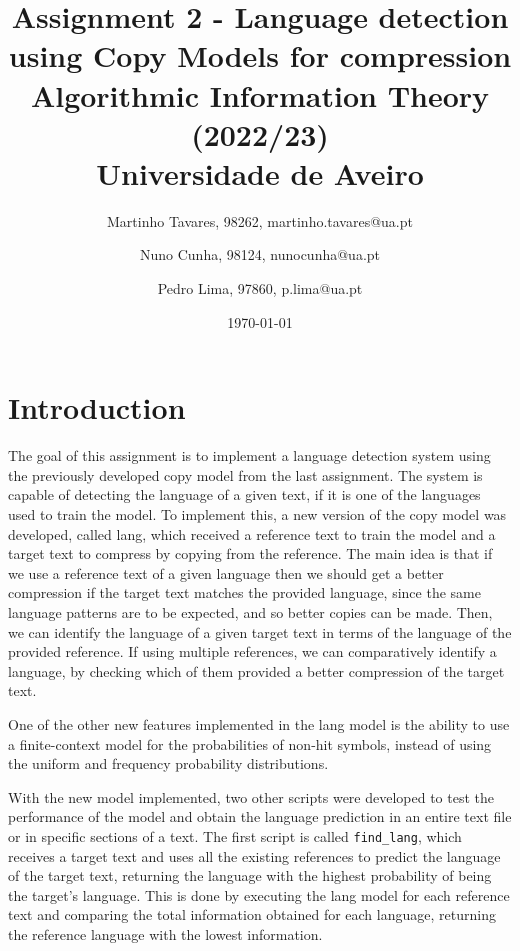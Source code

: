 \documentclass{article}
\begin{document}
\title{
    Assignment 2 - Language detection using Copy Models for compression \\
    \large{Algorithmic Information Theory (2022/23) \\
    Universidade de Aveiro}
}

\author{
    Martinho Tavares, 98262, martinho.tavares@ua.pt \and
    Nuno Cunha, 98124, nunocunha@ua.pt \and
    Pedro Lima, 97860, p.lima@ua.pt
}

\date{\today}
\maketitle

\section{Introduction}
\label{sec:introduction}

The goal of this assignment is to implement a language detection system using the previously developed copy model from the last assignment.
The system is capable of detecting the language of a given text, if it is one of the languages used to train the model.
To implement this, a new version of the copy model was developed, called lang, which received a reference text to train the model and a target text to compress by copying from the reference.
The main idea is that if we use a reference text of a given language then we should get a better compression if the target text matches the provided language, since the same language patterns are to be expected, and so better copies can be made.
Then, we can identify the language of a given target text in terms of the language of the provided reference.
If using multiple references, we can comparatively identify a language, by checking which of them provided a better compression of the target text.

One of the other new features implemented in the lang model is the ability to use a finite-context model for the probabilities of non-hit symbols, instead of using the uniform and frequency probability distributions.

With the new model implemented, two other scripts were developed to test the performance of the model and obtain the language prediction in an entire text file or in specific sections of a text.
The first script is called \verb|find_lang|, which receives a target text and uses all the existing references to predict the language of the target text, returning the language with the highest probability of being the target's language.
This is done by executing the lang model for each reference text and comparing the total information obtained for each language, returning the reference language with the lowest information.
\end{document}
